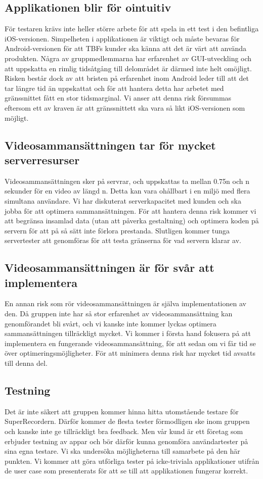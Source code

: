 \subsection{Applikationen blir för ointuitiv}
För testaren krävs inte heller större arbete för att spela in ett test i den befintliga iOS-versionen. Simpelheten i applikationen är viktigt och måste bevaras för Android-versionen för att TBFs kunder ska känna att det är värt att använda produkten. Några av gruppmedlemmarna har erfarenhet av GUI-utveckling och att uppskatta en rimlig tidsåtgång till delområdet är därmed inte helt omöjligt. Risken består dock av att bristen på erfarenhet inom Android leder till att det tar längre tid än uppskattat och för att hantera detta har arbetet med gränssnittet fått en stor tidsmarginal. Vi anser att denna risk försummas eftersom ett av kraven är att gränssnittett ska vara så likt iOS-versionen som möjligt.

\subsection{Videosammansättningen tar för mycket serverresurser}
Videosammansättningen sker på servrar, och uppskattas ta mellan 0.75n och n sekunder för en video av längd n. Detta kan vara ohållbart i en miljö med flera simultana användare. Vi har diskuterat serverkapacitet med kunden och ska jobba för att optimera sammansättningen. För att hantera denna risk kommer vi att begränsa insamlad data (utan att påverka gestaltning) och optimera koden på servern för att på så sätt inte förlora prestanda. Slutligen kommer tunga servertester att genomföras för att testa gränserna för vad servern klarar av.

\subsection{Videosammansättningen är för svår att implementera}
En annan risk som rör videosammansättningen är själva implementationen av den. Då gruppen inte har så stor erfarenhet av videosammansättning kan genomförandet bli svårt, och vi kanske inte kommer lyckas optimera sammansättningen tillräckligt mycket. Vi kommer i första hand fokusera på att implementera en fungerande videosammansättning, för att sedan om vi får tid se över optimeringsmöjligheter. För att minimera denna risk har mycket tid avsatts till denna del.

\subsection{Testning}
Det är inte säkert att gruppen kommer hinna hitta utomstående testare för SuperRecordern. Därför kommer de flesta tester förmodligen ske inom gruppen och kanske inte ge tillräckligt bra feedback. Men vår kund är ett företag som erbjuder testning av appar och bör därför kunna genomföra användartester på sina egna testare. Vi ska undersöka möjligheterna till samarbete på den här punkten. Vi kommer att göra utförliga tester på icke-triviala applikationer utifrån de user case som presenterats för att se till att applikationen fungerar korrekt.

